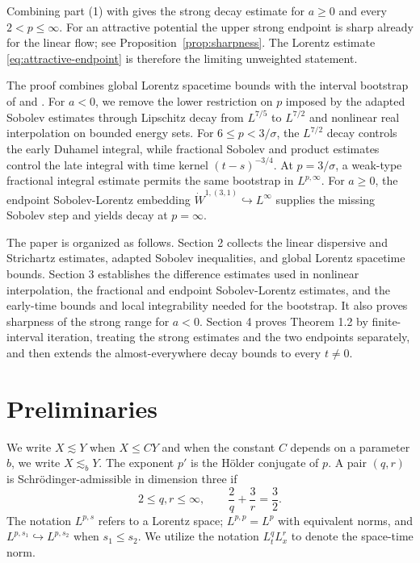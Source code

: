\documentclass[preprint,12pt]{elsarticle}
\numberwithin{equation}{section}
\theoremstyle{definition}
\theoremstyle{remark}
\begin{document}
Combining part (1) with \cite[Theorem~1.2]{WangXuZhang} gives the
strong decay estimate for $a\geq0$ and every $2<p\leq\infty$. For an
attractive potential the upper strong endpoint is sharp already for
the linear flow; see Proposition~\ref{prop:sharpness}. The Lorentz
estimate \eqref{eq:attractive-endpoint} is therefore the limiting
unweighted statement.


 The proof combines global Lorentz spacetime bounds with the interval bootstrap of \cite[Section~3]{Kowalski} and \cite[Section~4]{WangXuZhang}. For \(a<0\), we remove the lower restriction on \(p\) imposed by the adapted Sobolev estimates through Lipschitz decay from \(L^{7/5}\) to \(L^{7/2}\) and nonlinear real interpolation on bounded energy sets. For \(6\le p<3/\sigma\), the \(L^{7/2}\) decay controls the early Duhamel integral, while fractional Sobolev and product estimates control the late integral with time kernel \((t-s)^{-3/4}\). At \(p=3/\sigma\), a weak-type fractional integral estimate permits the same bootstrap in \(L^{p,\infty}\). For \(a\ge0\), the endpoint Sobolev-Lorentz embedding \(\dot W^{1,(3,1)}\hookrightarrow L^\infty\) supplies the missing Sobolev step and yields decay at \(p=\infty\).

The paper is organized as follows. Section 2 collects the linear dispersive and Strichartz estimates, adapted Sobolev inequalities, and global Lorentz spacetime bounds. Section 3 establishes the difference estimates used in nonlinear interpolation, the fractional and endpoint Sobolev-Lorentz estimates, and the early-time bounds and local integrability needed for the bootstrap. It also proves sharpness of the strong range for \(a<0\). Section 4 proves Theorem 1.2 by finite-interval iteration, treating the strong estimates and the two endpoints separately, and then extends the almost-everywhere decay bounds to every \(t\ne0\).


\section{Preliminaries}

We write $X\lesssim Y$ when $X\leq CY$ and when the constant $C$ depends on a parameter $b$, we write $X\lesssim_b Y$. The exponent $p'$ is the
H\"older conjugate of $p$. A pair $(q,r)$ is Schr\"odinger-admissible
in dimension three if
\[
 2\leq q,r\leq\infty,
 \qquad \frac2q+\frac3r=\frac32.
\]
The notation $L^{p,s}$ refers to a Lorentz space; $L^{p,p}=L^p$ with
equivalent norms, and $L^{p,s_1}\hookrightarrow L^{p,s_2}$ when
$s_1\leq s_2$. We utilize the notation $L^q_t L^r_x$ to denote the space-time norm.
\end{document}
